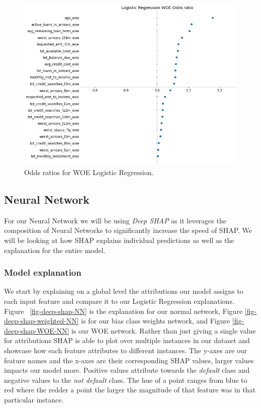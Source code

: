 \begin  {figure}[!htpb]
\centering
  \includegraphics[width=0.8\linewidth]{Credit_Images/LR_WOE_ODDS.png}
   \caption{Odds ratios for WOE Logistic Regression.}
    \label{fig-odds-woe}
\end{figure}


\subsection{Neural Network}
For our Neural Network we will be using \emph{Deep SHAP} as it leverages the composition of Neural Networks to significantly increase the speed of SHAP.
We will be looking at how SHAP explains individual predictions as well as the explanation for the entire model.
\subsubsection{Model explanation}
We start by explaining on a global level the attributions our model assigns to each input feature and compare it to our Logistic Regression explanations. Figure~ \ref{fig-deep-shap-NN} is the explanation for our normal network, Figure \ref{fig-deep-shap-weighted-NN} is for our bias class weights network, and Figure \ref{fig-deep-shap-WOE-NN} is our WOE network. Rather than just giving a single value for attributions SHAP is able to plot over multiple instances in our dataset and showcase how each feature attributes to different instances. The y-axes are our feature names and the x-axes are their corresponding SHAP values, larger values impacts our model more. Positive values attribute towards the \emph{default} class and negative values to the \emph{not default} class. The hue of a point ranges from blue to red where the redder a point the larger the magnitude of that feature was in that particular instance.
